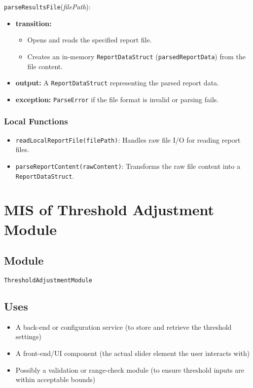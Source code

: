\documentclass[12pt, titlepage]{article}
\begin{document}
\noindent \texttt{parseResultsFile}(\textit{filePath}):
\begin{itemize}
    \item \textbf{transition:}
    \begin{itemize}
        \item Opens and reads the specified report file.
        \item Creates an in-memory \texttt{ReportDataStruct} (\texttt{parsedReportData}) from the file content.
    \end{itemize}
    \item \textbf{output:} A \texttt{ReportDataStruct} representing the parsed report data.
    \item \textbf{exception:} \texttt{ParseError} if the file format is invalid or parsing fails.
\end{itemize}

\subsubsection{Local Functions}

\begin{itemize}
    \item \texttt{readLocalReportFile(filePath)}: Handles raw file I/O for reading report files.
    \item \texttt{parseReportContent(rawContent)}: Transforms the raw file content into a \texttt{ReportDataStruct}.
\end{itemize}

\section{MIS of Threshold Adjustment Module} \label{mThreshold}


\subsection{Module}

\texttt{ThresholdAdjustmentModule}

\subsection{Uses}

\begin{itemize}
    \item A back-end or configuration service (to store and retrieve the threshold settings)
    \item A front-end/UI component (the actual slider element the user interacts with)
    \item Possibly a validation or range-check module (to ensure threshold inputs are within acceptable bounds)
\end{itemize}
\end{document}
